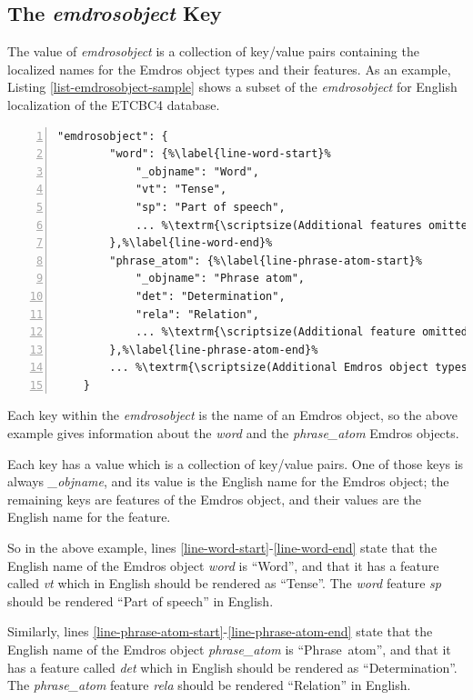 \documentclass[11pt,oneside,a4paper]{memoir}
\begin{document}
\subsection{The \emph{emdrosobject} Key}\label{emdrosobject-loc}

The value of \emph{emdrosobject} is a collection of key/value pairs containing the localized names
for the Emdros object types and their features. As an
example, Listing \ref{list-emdrosobject-sample} shows a subset of the \emph{emdrosobject} for
English localization of the ETCBC4 database.

\begin{lstlisting}[numbers=left,caption=A sample emdrosobject value,label=list-emdrosobject-sample]
    "emdrosobject": {
        "word": {%\label{line-word-start}%
            "_objname": "Word",
            "vt": "Tense",
            "sp": "Part of speech",
            ... %\textrm{\scriptsize(Additional features omitted)}%
        },%\label{line-word-end}%
        "phrase_atom": {%\label{line-phrase-atom-start}%
            "_objname": "Phrase atom",
            "det": "Determination",
            "rela": "Relation",
            ... %\textrm{\scriptsize(Additional feature omitted)}%
        },%\label{line-phrase-atom-end}%
        ... %\textrm{\scriptsize(Additional Emdros object types omitted)}%
    }
\end{lstlisting}


Each key within the \emph{emdrosobject} is the name of an Emdros object, so the above example gives
information about the \emph{word} and the \emph{phrase\_atom} Emdros objects.

Each key has a value which is a collection of key/value pairs. One of those keys is always
\emph{\_objname}, and its value is the English name for the Emdros object; the remaining keys are
features of the Emdros object, and their values are the English name for the feature.

So in the above example, lines \ref{line-word-start}-\ref{line-word-end} state that the English name
of the Emdros object \emph{word} is ``Word'', and that it has a feature called \emph{vt} which
in English should be rendered as ``Tense''. The \emph{word} feature \emph{sp} should be rendered
``Part of speech'' in English.

Similarly, lines \ref{line-phrase-atom-start}-\ref{line-phrase-atom-end} state that the English name
of the Emdros object \emph{phrase\_atom} is ``Phrase~atom'', and that it has a feature called
\emph{det} which in English should be rendered as ``Determination''. The \emph{phrase\_atom} feature
\emph{rela} should be rendered ``Relation'' in English.
\end{document}
